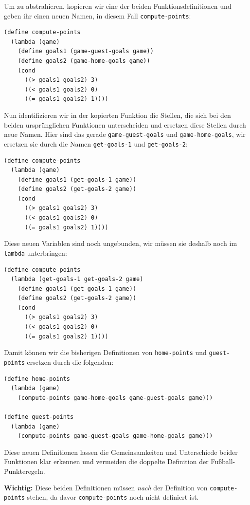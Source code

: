 \noindent Um zu abstrahieren, kopieren wir eine der beiden Funktionsdefinitionen und
geben ihr einen neuen Namen, in diesem Fall \lstinline{compute-points}:
%
\begin{lstlisting}
(define compute-points
  (lambda (game)
    (define goals1 (game-guest-goals game))
    (define goals2 (game-home-goals game))
    (cond
      ((> goals1 goals2) 3)
      ((< goals1 goals2) 0)
      ((= goals1 goals2) 1))))
\end{lstlisting}
%
Nun identifizieren wir in der kopierten Funktion die Stellen, die sich
bei den beiden ursprünglichen Funktionen unterscheiden und ersetzen
diese Stellen durch neue Namen.  Hier sind das gerade
\lstinline{game-guest-goals} und \lstinline{game-home-goals}, wir
ersetzen sie durch die Namen \lstinline{get-goals-1} und
\lstinline{get-goals-2}:
%
\begin{lstlisting}
(define compute-points
  (lambda (game)
    (define goals1 (get-goals-1 game))
    (define goals2 (get-goals-2 game))
    (cond
      ((> goals1 goals2) 3)
      ((< goals1 goals2) 0)
      ((= goals1 goals2) 1))))
\end{lstlisting}
%
Diese neuen Variablen sind noch ungebunden, wir müssen sie deshalb
noch im \lstinline{lambda} unterbringen:
%
\begin{lstlisting}
(define compute-points
  (lambda (get-goals-1 get-goals-2 game)
    (define goals1 (get-goals-1 game))
    (define goals2 (get-goals-2 game))
    (cond
      ((> goals1 goals2) 3)
      ((< goals1 goals2) 0)
      ((= goals1 goals2) 1))))
\end{lstlisting}
%
Damit können wir die bisherigen Definitionen von
\lstinline{home-points} und \lstinline{guest-points} ersetzen durch
die folgenden:
%
\begin{lstlisting}
(define home-points
  (lambda (game)
    (compute-points game-home-goals game-guest-goals game)))

(define guest-points
  (lambda (game)
    (compute-points game-guest-goals game-home-goals game)))
\end{lstlisting}
%
Diese neuen Definitionen lassen die Gemeinsamkeiten und Unterschiede
beider Funktionen klar erkennen und vermeiden die doppelte Definition
der Fußball-Punkteregeln.

\textbf{Wichtig:} Diese beiden Definitionen müssen \emph{nach} der
Definition von \lstinline{compute-points} stehen, da davor
\lstinline{compute-points} noch nicht definiert ist.

